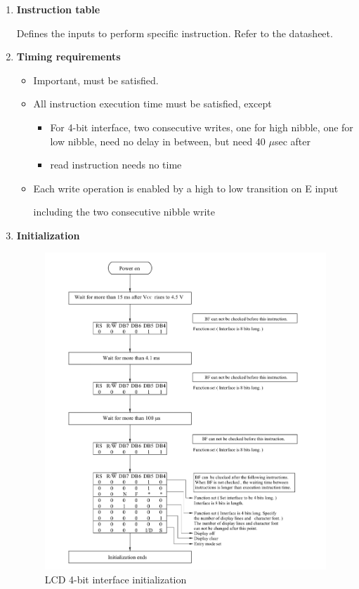 \documentclass[a4paper]{article}
\begin{document}
\begin{enumerate}[label = \arabic*.]
    \item \textbf{Instruction table}
      \par Defines the inputs to perform specific instruction. Refer to the datasheet.

    \item \textbf{Timing requirements}
      \begin{itemize}[leftmargin = 1cm]
        \item Important, must be satisfied.
        \item All instruction execution time must be satisfied, except
          \begin{itemize}[leftmargin = 1cm]
            \item For 4-bit interface, two consecutive writes, one for high nibble, one for low nibble, need no delay in between, but need 40 \( \mu \)sec after
            \item read instruction needs no time
          \end{itemize}
        \item Each write operation is enabled by a high to low transition on E input
          \par including the two consecutive nibble write
      \end{itemize}

    \item \textbf{Initialization}
      \begin{figure}[H]
        \centering
        \includegraphics[width=0.9\linewidth]{LCD_config_4bit_step.jpeg}
        \caption{LCD 4-bit interface initialization}
        \label{fig:LCD_config_4bit_step.jpeg}
      \end{figure}

  \end{enumerate}
\end{document}
